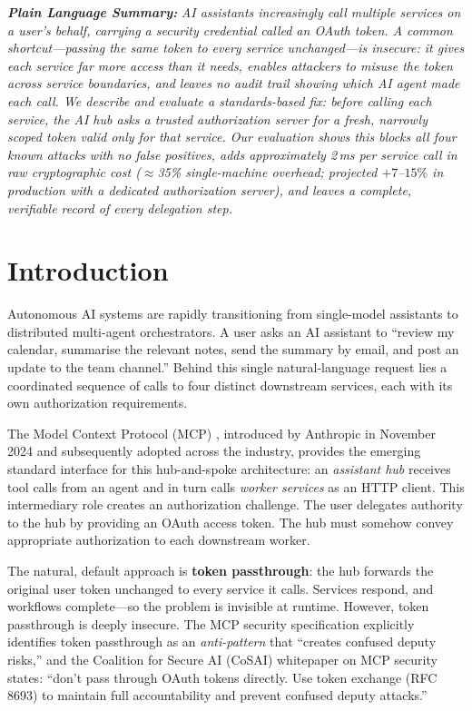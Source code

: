 \documentclass[journal]{IEEEtran}
\begin{document}
\vspace{4pt}
\noindent\textit{\textbf{Plain Language Summary:}}
\textit{AI assistants increasingly call multiple services on a user's behalf,
carrying a security credential called an OAuth token. A common
shortcut---passing the same token to every service unchanged---is insecure: it
gives each service far more access than it needs, enables attackers to misuse the
token across service boundaries, and leaves no audit trail showing which AI agent
made each call. We describe and evaluate a standards-based fix: before calling
each service, the AI hub asks a trusted authorization server for a fresh,
narrowly scoped token valid only for that service. Our evaluation shows this
blocks all four known attacks with no false positives, adds approximately 2\,ms
per service call in raw cryptographic cost ($\approx$35\% single-machine overhead;
projected $+7$--$15\%$ in production with a dedicated authorization server),
and leaves a complete, verifiable record of every delegation step.}

\section{Introduction}
\label{sec:introduction}

Autonomous AI systems are rapidly transitioning from single-model assistants to
distributed multi-agent orchestrators. A user asks an AI assistant to
``review my calendar, summarise the relevant notes, send the summary by email, and
post an update to the team channel.'' Behind this single natural-language request
lies a coordinated sequence of calls to four distinct downstream services, each
with its own authorization requirements.

The Model Context Protocol (MCP) \cite{mcp_spec,mcp_wiki}, introduced by Anthropic in
November 2024 and subsequently adopted across the industry, provides the emerging
standard interface for this hub-and-spoke architecture: an \textit{assistant hub}
receives tool calls from an agent and in turn calls \textit{worker services} as
an HTTP client. This intermediary role creates an authorization challenge. The
user delegates authority to the hub by providing an OAuth access token. The hub
must somehow convey appropriate authorization to each downstream worker.

The natural, default approach is \textbf{token passthrough}: the hub forwards
the original user token unchanged to every service it calls. Services respond,
and workflows complete---so the problem is invisible at runtime. However,
token passthrough is deeply insecure. The MCP security specification \cite{mcp_security} explicitly
identifies token passthrough as an \textit{anti-pattern} that ``creates confused
deputy risks,'' and the Coalition for Secure AI (CoSAI) whitepaper on MCP
security \cite{cosai_mcp} states: ``don't pass through OAuth tokens directly.
Use token exchange (RFC 8693) to maintain full accountability and prevent confused
deputy attacks.''
\end{document}
